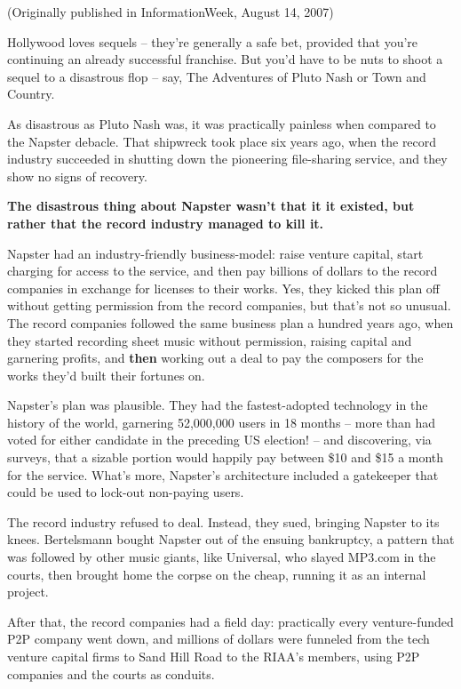 (Originally published in InformationWeek, August 14, 2007)

Hollywood loves sequels -- they're generally a safe bet, provided
that you're continuing an already successful franchise. But you'd
have to be nuts to shoot a sequel to a disastrous flop -- say, The
Adventures of Pluto Nash or Town and Country.

As disastrous as Pluto Nash was, it was practically painless when
compared to the Napster debacle. That shipwreck took place six
years ago, when the record industry succeeded in shutting down the
pioneering file-sharing service, and they show no signs of
recovery.

\textbf{The disastrous thing about Napster wasn't that it it existed, but rather that the record industry managed to kill it.}

Napster had an industry-friendly business-model: raise venture
capital, start charging for access to the service, and then pay
billions of dollars to the record companies in exchange for
licenses to their works. Yes, they kicked this plan off without
getting permission from the record companies, but that's not so
unusual. The record companies followed the same business plan a
hundred years ago, when they started recording sheet music without
permission, raising capital and garnering profits, and
\textbf{then} working out a deal to pay the composers for the works
they'd built their fortunes on.

Napster's plan was plausible. They had the fastest-adopted
technology in the history of the world, garnering 52,000,000 users
in 18 months -- more than had voted for either candidate in the
preceding US election! -- and discovering, via surveys, that a
sizable portion would happily pay between \$10 and \$15 a month for
the service. What's more, Napster's architecture included a
gatekeeper that could be used to lock-out non-paying users.

The record industry refused to deal. Instead, they sued, bringing
Napster to its knees. Bertelsmann bought Napster out of the ensuing
bankruptcy, a pattern that was followed by other music giants, like
Universal, who slayed MP3.com in the courts, then brought home the
corpse on the cheap, running it as an internal project.

After that, the record companies had a field day: practically every
venture-funded P2P company went down, and millions of dollars were
funneled from the tech venture capital firms to Sand Hill Road to
the RIAA's members, using P2P companies and the courts as
conduits.

